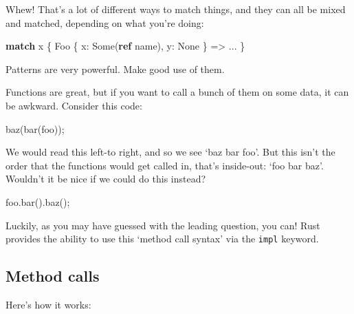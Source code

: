 \documentclass[a4paper,]{book}
\newenvironment{Shaded}{\begin{snugshade}}{\end{snugshade}}
\newcommand{\KeywordTok}[1]{\textcolor[rgb]{0.13,0.29,0.53}{\textbf{{#1}}}}
\newcommand{\ConstantTok}[1]{\textcolor[rgb]{0.00,0.00,0.00}{{#1}}}
\newcommand{\NormalTok}[1]{{#1}}
\begin{document}
Whew! That's a lot of different ways to match things, and they can all
be mixed and matched, depending on what you're doing:

\begin{Shaded}
\begin{Highlighting}[]
\KeywordTok{match} \NormalTok{x \{}
    \NormalTok{Foo \{ x: }\ConstantTok{Some}\NormalTok{(}\KeywordTok{ref} \NormalTok{name), y: }\ConstantTok{None} \NormalTok{\} => ...}
\NormalTok{\}}
\end{Highlighting}
\end{Shaded}

Patterns are very powerful. Make good use of them.


Functions are great, but if you want to call a bunch of them on some
data, it can be awkward. Consider this code:

\begin{Shaded}
\begin{Highlighting}[]
\NormalTok{baz(bar(foo));}
\end{Highlighting}
\end{Shaded}

We would read this left-to right, and so we see `baz bar foo'. But this
isn't the order that the functions would get called in, that's
inside-out: `foo bar baz'. Wouldn't it be nice if we could do this
instead?

\begin{Shaded}
\begin{Highlighting}[]
\NormalTok{foo.bar().baz();}
\end{Highlighting}
\end{Shaded}

Luckily, as you may have guessed with the leading question, you can!
Rust provides the ability to use this `method call syntax' via the
\texttt{impl} keyword.

\subsection{Method calls}\label{method-calls}

Here's how it works:
\end{document}

